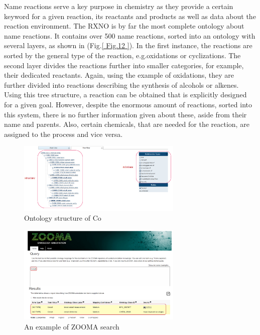 \documentclass[%
 aip,
 jmp,%
 amsmath,amssymb,
 reprint,%
]{revtex4-2}
\begin{document}
Name reactions serve a key purpose in chemistry as they provide a certain keyword for a given reaction, its reactants and products as well as data about the reaction environment. The RXNO\cite{pachl2020overview} is by far the most complete ontology about name reactions. It contains over 500 name reactions, sorted into an ontology with several layers, as shown in (Fig.\ref{ Fig.12 }). In the first instance, the reactions are sorted by the general type of the reaction, e.g.oxidations or cyclizations. The second layer divides the reactions further into smaller categories, for example, their dedicated reactants. Again, using the example of oxidations, they are further divided into reactions describing the synthesis of alcohols or alkenes. Using this tree structure, a reaction can be obtained that is explicitly designed for a given goal. However, despite the enormous amount of reactions, sorted into this system, there is no further information given about these, aside from their name and parents. Also, certain chemicals, that are needed for the reaction, are assigned to the process and vice versa.


\begin{figure}[htbp]
 \centering
 \includegraphics[width=0.7\textwidth]{figure/10.png}
 \caption{ Ontology structure of Co }
 \label{ Fig.10 }
\end{figure}

\begin{figure}[htbp]
 \centering
 \includegraphics[width=0.7\textwidth]{figure/11.png}
 \caption{ An example of ZOOMA search }
 \label{ Fig.11 }
\end{figure}
\end{document}
